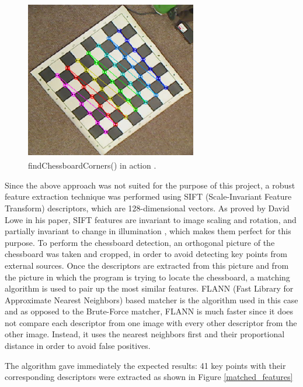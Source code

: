 \documentclass{l4proj}
\begin{document}
\begin{figure}[h!]
\centering
\includegraphics[height=7cm,width=7.5cm]{findChessBoardCorners.png}
\caption{findChessboardCorners() in action \cite{FindChessboardCorners}.}
\label{findChessboardCorners}
\end{figure}


Since the above approach was not suited for the purpose of this project, a robust feature extraction technique was performed using SIFT (Scale-Invariant Feature Transform) descriptors, which are 128-dimensional vectors. As proved by David Lowe in his paper, SIFT features are invariant to image scaling and rotation, and partially invariant to change in illumination \cite{DavidLowe}, which makes them perfect for this purpose. To perform the chessboard detection, an orthogonal picture of the chessboard was taken and cropped, in order to avoid detecting key points from external sources. Once the descriptors are extracted from this picture and from the picture in which the program is trying to locate the chessboard, a matching algorithm is used to pair up the most similar features. FLANN (Fast Library for Approximate Nearest Neighbors) based matcher is the algorithm used in this case and as opposed to the Brute-Force matcher, FLANN is much faster since it does not compare each descriptor from one image with every other descriptor from the other image. Instead, it uses the nearest neighbors first and their proportional distance in order to avoid false positives.

The algorithm gave immediately the expected results: 41 key points with their corresponding descriptors were extracted as shown in Figure \ref{matched_features}
\end{document}
